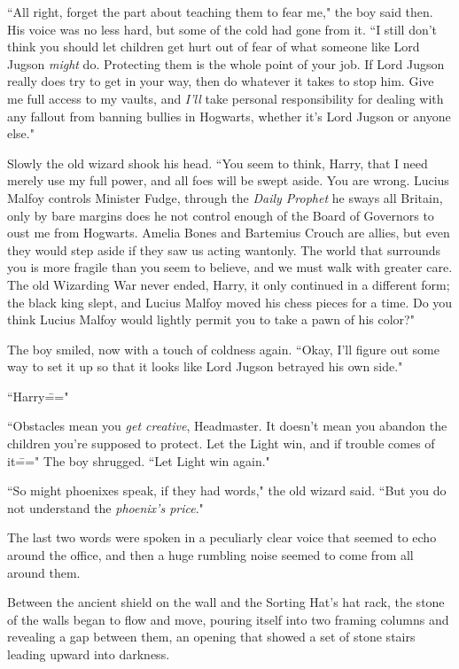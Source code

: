 ``All right, forget the part about teaching them to fear me," the boy said then. His voice was no less hard, but some of the cold had gone from it. ``I still don't think you should let children get hurt out of fear of what someone like Lord Jugson \emph{might} do. Protecting them is the whole point of your job. If Lord Jugson really does try to get in your way, then do whatever it takes to stop him. Give me full access to my vaults, and \emph{I'll} take personal responsibility for dealing with any fallout from banning bullies in Hogwarts, whether it's Lord Jugson or anyone else."

Slowly the old wizard shook his head. ``You seem to think, Harry, that I need merely use my full power, and all foes will be swept aside. You are wrong. Lucius Malfoy controls Minister Fudge, through the \emph{Daily Prophet} he sways all Britain, only by bare margins does he not control enough of the Board of Governors to oust me from Hogwarts. Amelia Bones and Bartemius Crouch are allies, but even they would step aside if they saw us acting wantonly. The world that surrounds you is more fragile than you seem to believe, and we must walk with greater care. The old Wizarding War never ended, Harry, it only continued in a different form; the black king slept, and Lucius Malfoy moved his chess pieces for a time. Do you think Lucius Malfoy would lightly permit you to take a pawn of his color?"

The boy smiled, now with a touch of coldness again. ``Okay, I'll figure out some way to set it up so that it looks like Lord Jugson betrayed his own side."

``Harry\==="

``Obstacles mean you \emph{get creative}, Headmaster. It doesn't mean you abandon the children you're supposed to protect. Let the Light win, and if trouble comes of it\===" The boy shrugged. ``Let Light win again."

``So might phoenixes speak, if they had words," the old wizard said. ``But you do not understand the \emph{phoenix's price}."

The last two words were spoken in a peculiarly clear voice that seemed to echo around the office, and then a huge rumbling noise seemed to come from all around them.

Between the ancient shield on the wall and the Sorting Hat's hat rack, the stone of the walls began to flow and move, pouring itself into two framing columns and revealing a gap between them, an opening that showed a set of stone stairs leading upward into darkness.

